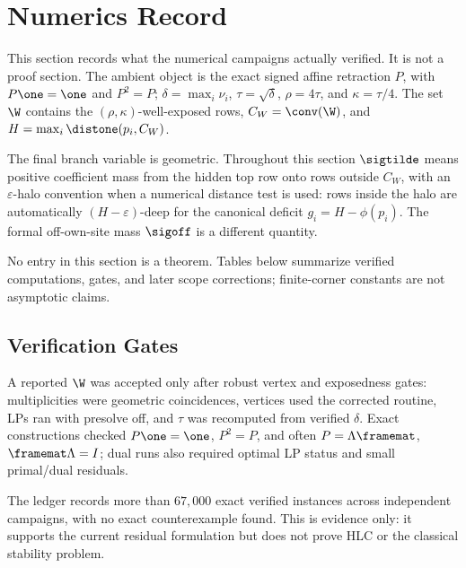 \section{Numerics Record}\label{sec:numerics-record}

This section records what the numerical campaigns actually verified.  It is not
a proof section.  The ambient object is the exact signed affine retraction
\(P\), with \(P\one=\one\) and \(P^2=P\); \(\delta=\max_i\nu_i\),
\(\tau=\sqrt{\delta}\), \(\rho=4\tau\), and \(\kappa=\tau/4\).  The set \(\W\)
contains the \((\rho,\kappa)\)-well-exposed rows, \(C_W=\conv(\W)\), and
\(H=\max_i\distone(p_i,C_W)\).

The final branch variable is geometric.  Throughout this section
\(\sigtilde\) means positive coefficient mass from the hidden top row onto
rows outside \(C_W\), with an \(\varepsilon\)-halo convention when a numerical
distance test is used: rows inside the halo are automatically
\((H-\varepsilon)\)-deep for the canonical deficit \(g_i=H-\phi(p_i)\).  The
formal off-own-site mass \(\sigoff\) is a different quantity.

\begin{warning}\numbadge No entry in this section is a theorem.  Tables below summarize
verified computations, gates, and later scope corrections; finite-corner
constants are not asymptotic claims.
\end{warning}

\subsection{Verification Gates}

A reported \(\W\) was accepted only after robust vertex and exposedness gates:
multiplicities were geometric coincidences, vertices used the corrected routine,
LPs ran with presolve off, and \(\tau\) was recomputed from verified
\(\delta\).  Exact constructions checked \(P\one=\one\), \(P^2=P\), and often
\(P=\Lambda\framemat\), \(\framemat\Lambda=I\); dual runs also required optimal
LP status and small primal/dual residuals.

\begin{numericalresult}
\numbadge The ledger records more than \(67{,}000\) exact verified instances
across independent campaigns, with no exact counterexample found.  This is
evidence only: it supports the current residual formulation but does not prove
HLC or the classical stability problem.
\end{numericalresult}


